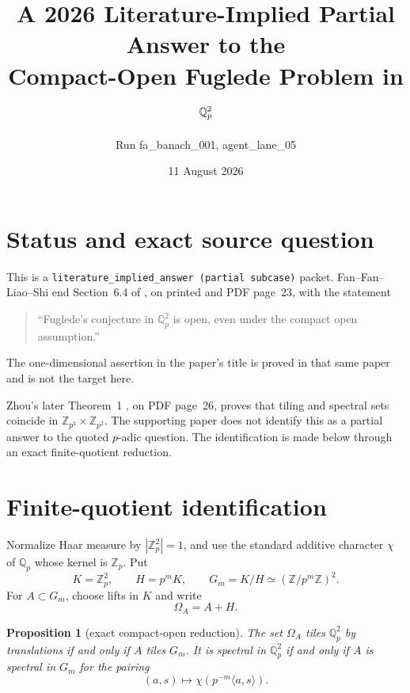 \documentclass[11pt]{article}
\title{A 2026 Literature-Implied Partial Answer to the\\
Compact-Open Fuglede Problem in $\Qp^2$}
\author{Run fa\_banach\_001, agent\_lane\_05}
\date{11 August 2026}
\newtheorem{proposition}{Proposition}
\newcommand{\Qp}{\mathbb Q_p}
\newcommand{\Zp}{\mathbb Z_p}
\newcommand{\Gm}{G_m}
\begin{document}
\maketitle

\section*{Status and exact source question}

This is a \texttt{literature\_implied\_answer (partial subcase)} packet.
Fan--Fan--Liao--Shi end Section~6.4 of \cite{FFLS}, on printed and PDF
page~23, with the statement
\begin{quote}
``Fuglede's conjecture in $\mathbb Q_p^2$ is open, even under the compact
open assumption.''
\end{quote}
The one-dimensional assertion in the paper's title is proved in that same
paper and is not the target here.

Zhou's later Theorem~1 \cite{Zhou}, on PDF page~26, proves that tiling and
spectral sets coincide in
$\mathbb Z_{p^2}\times\mathbb Z_{p^2}$.  The supporting paper does not
identify this as a partial answer to the quoted $p$-adic question.  The
identification is made below through an exact finite-quotient reduction.

\section*{Finite-quotient identification}

Normalize Haar measure by $|\Zp^2|=1$, and use the standard additive
character $\chi$ of $\Qp$ whose kernel is $\Zp$.  Put
\[
 K=\Zp^2,\qquad H=p^mK,\qquad
 \Gm=K/H\simeq(\mathbb Z/p^m\mathbb Z)^2.
\]
For $A\subset\Gm$, choose lifts in $K$ and write
\[
 \Omega_A=A+H.
\]

\begin{proposition}[exact compact-open reduction]\label{prop:reduction}
The set $\Omega_A$ tiles $\Qp^2$ by translations if and only if $A$ tiles
$\Gm$.  It is spectral in $\Qp^2$ if and only if $A$ is spectral in
$\Gm$ for the pairing
\[
 (a,s)\longmapsto \chi\!\left(p^{-m}\langle a,s\rangle\right).
\]
\end{proposition}
\end{document}
